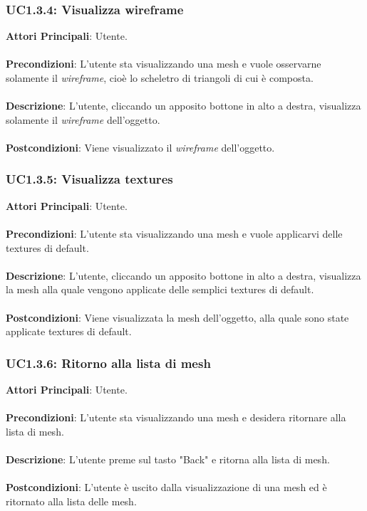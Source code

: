 \subsubsection{UC1.3.4: Visualizza wireframe}
\textbf{Attori Principali}: Utente.
\\\\ \textbf{Precondizioni}: L'utente sta visualizzando una mesh e vuole osservarne solamente il \emph{wireframe}, cioè lo scheletro di triangoli di cui è composta.
\\\\ \textbf{Descrizione}: L'utente, cliccando un apposito bottone in alto a destra, visualizza solamente il \emph{wireframe} dell'oggetto.
\\\\ \textbf{Postcondizioni}: Viene visualizzato il \emph{wireframe} dell'oggetto.

\subsubsection{UC1.3.5: Visualizza textures}
\textbf{Attori Principali}: Utente.
\\\\ \textbf{Precondizioni}: L'utente sta visualizzando una mesh e vuole applicarvi delle textures di default.
\\\\ \textbf{Descrizione}: L'utente, cliccando un apposito bottone in alto a destra, visualizza la mesh alla quale vengono applicate delle semplici textures di default.
\\\\ \textbf{Postcondizioni}: Viene visualizzata la mesh dell'oggetto, alla quale sono state applicate textures di default.

\subsubsection{UC1.3.6: Ritorno alla lista di mesh}
\textbf{Attori Principali}: Utente.
\\\\ \textbf{Precondizioni}: L'utente sta visualizzando una mesh e desidera ritornare alla lista di mesh.
\\\\ \textbf{Descrizione}: L'utente preme sul tasto "Back" e ritorna alla lista di mesh.
\\\\ \textbf{Postcondizioni}: L'utente è uscito dalla visualizzazione di una mesh ed è ritornato alla lista delle mesh.


